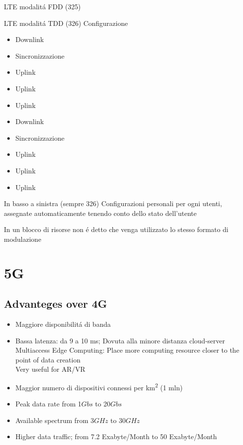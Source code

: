 \documentclass{article}
\begin{document}
LTE modalit\'a FDD (325)

LTE modalit\'a TDD (326)
Configurazione
\begin{itemize}
    \item Downlink
    \item Sincronizzazione
    \item Uplink
    \item Uplink
    \item Uplink
    \item Downlink
    \item Sincronizzazione
    \item Uplink
    \item Uplink
    \item Uplink
\end{itemize}

In basso a sinistra (sempre 326) Configurazioni personali per ogni utenti, assegnate automaticamente tenendo conto dello stato dell'utente

In un blocco di risorse non \'e detto che venga utilizzato lo stesso formato di modulazione

\section{5G}

\subsection{Advanteges over 4G}

\begin{itemize}
    \item Maggiore disponibilit\'a di banda
    \item Bassa latenza: da 9 a 10 ms; Dovuta alla minore distanza cloud-server\\
        Multiaccess Edge Computing: Place more computing resource closer to the point of data creation\\
        Very useful for AR/VR

    \item Maggior numero di dispositivi connessi per km\textsuperscript{2} (1 mln)
    \item Peak data rate from 1\(Gbs\) to 20\(Gbs\)
    \item Available spectrum from 3\(GHz\) to 30\(GHz\)
    \item Higher data traffic; from 7.2 Exabyte/Month to 50 Exabyte/Month

\end{itemize}
\end{document}
